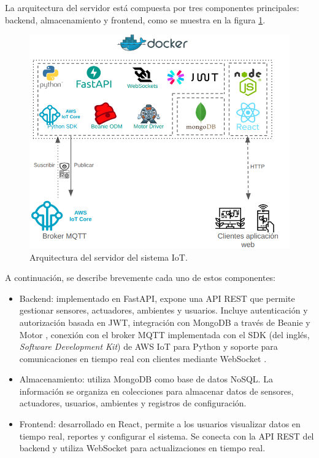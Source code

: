\label{sec:arquitecturaServidor}

La arquitectura del servidor está compuesta por tres componentes principales:
backend, almacenamiento y frontend, como se muestra en la figura
\ref{fig:arquitectura servidor}.

\begin{figure}[H]
    \centering
    \includegraphics[width=.97\textwidth]{./Images/16.png}
    \caption{Arquitectura del servidor del sistema IoT.}
    \label{fig:arquitectura servidor}
\end{figure}

A continuación, se describe brevemente cada uno de estos componentes:

\begin{itemize}
    \item Backend: implementado en FastAPI, expone una API REST que permite gestionar
          sensores, actuadores, ambientes y usuarios. Incluye autenticación y
          autorización basada en JWT, integración con MongoDB a través de Beanie
          \cite{BeaniODM} y Motor \cite{MotorMongoDB}, conexión con el broker MQTT
          implementada con el SDK (del inglés, \textit{Software Development Kit}) de AWS
          IoT para Python \cite{AWSIoTSDK} y soporte para comunicaciones en tiempo real
          con clientes mediante WebSocket \cite{FastAPIWebSockets}.

    \item Almacenamiento: utiliza MongoDB como base de datos NoSQL. La información se
          organiza en colecciones para almacenar datos de sensores, actuadores, usuarios,
          ambientes y registros de configuración.

    \item Frontend: desarrollado en React, permite a los usuarios visualizar datos en
          tiempo real, reportes y configurar el sistema. Se conecta con la API REST del
          backend y utiliza WebSocket para actualizaciones en tiempo real.
\end{itemize}

